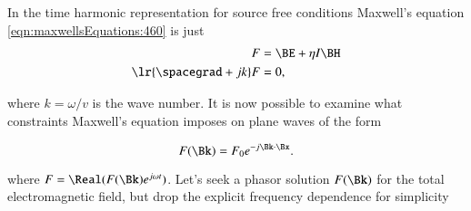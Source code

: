 %
%
In the time harmonic representation for source free conditions Maxwell's equation \cref{eqn:maxwellsEquations:460} is just
\begin{dmath}\label{eqn:planewaves:560}
\begin{aligned}
F &= \BE + \eta I \BH \\
\lr{ \spacegrad + j k } F &= 0,
\end{aligned}
\end{dmath}

where \( k = \omega/v \) is the wave number.
It is now possible to examine what constraints Maxwell's equation imposes on plane waves of the form

\begin{dmath}\label{eqn:planewaves:600}
F(\Bk) = F_0 e^{-j \Bk \cdot \Bx}.
\end{dmath}

where \( F = \Real( F(\Bk) e^{j \omega t} ) \).
Let's seek a phasor solution \( F(\Bk) \) for the total electromagnetic field, but drop the explicit frequency dependence for simplicity



